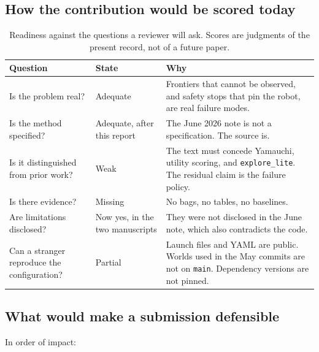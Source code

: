 \documentclass[11pt]{article}
\begin{document}
\subsection{How the contribution would be scored today}
\begin{table}[ht]
\centering
\caption{Readiness against the questions a reviewer will ask. Scores are judgments of the present record, not of a future paper.}
\small
\begin{tabular}{@{}p{4.2cm}p{2.2cm}p{7.6cm}@{}}
\toprule
Question & State & Why \\
\midrule
Is the problem real? & Adequate & Frontiers that cannot be observed, and safety stops that pin the robot, are real failure modes. \\
Is the method specified? & Adequate, after this report & The June 2026 note is not a specification. The source is. \\
Is it distinguished from prior work? & Weak & The text must concede Yamauchi, utility scoring, and \texttt{explore\_lite}. The residual claim is the failure policy. \\
Is there evidence? & Missing & No bags, no tables, no baselines. \\
Are limitations disclosed? & Now yes, in the two manuscripts & They were not disclosed in the June note, which also contradicts the code. \\
Can a stranger reproduce the configuration? & Partial & Launch files and YAML are public. Worlds used in the May commits are not on \texttt{main}. Dependency versions are not pinned. \\
\bottomrule
\end{tabular}
\end{table}

\subsection{What would make a submission defensible}
In order of impact:
\end{document}
